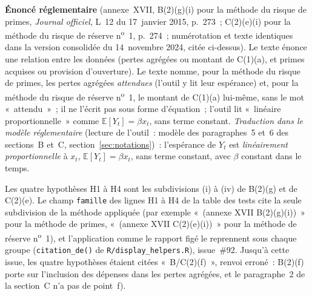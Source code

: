 \documentclass[a4paper,11pt]{article}
\newcommand{\code}[1]{\texttt{\small #1}}
\begin{document}
\begin{encadre}
\textbf{Énoncé réglementaire} (annexe~XVII, B(2)(g)(i) pour la méthode du risque de primes,
\emph{Journal officiel}, L~12 du 17~janvier 2015, p.~273~; C(2)(e)(i) pour la méthode du risque
de réserve n\textsuperscript{o}~1, p.~274~; numérotation et texte identiques dans la version
consolidée du 14~novembre 2024, citée ci-dessus). Le texte énonce une relation entre les données
(pertes agrégées ou montant de C(1)(a), et primes acquises ou provision d'ouverture). Le texte
nomme, pour la méthode du risque de primes, les pertes agrégées \emph{attendues} (l'outil y
lit leur espérance) et, pour la méthode du risque de réserve n\textsuperscript{o}~1, le montant
de C(1)(a) lui-même, sans le mot «~attendu~»~; il ne l'écrit pas sous forme d'équation~;
l'outil lit «~linéaire proportionnelle~» comme $\mathbb{E}[Y_t] = \beta x_t$, sans terme
constant. \emph{Traduction dans le modèle réglementaire} (lecture de
l'outil~: modèle des paragraphes~5 et~6 des sections~B et~C, section~\ref{sec:notations})~:
l'espérance de $Y_t$ est \emph{linéairement proportionnelle} à $x_t$,
$\mathbb{E}[Y_t] = \beta x_t$, sans terme constant, avec $\beta$ constant dans le temps.

\smallskip
Les quatre hypothèses H1 à H4 sont les subdivisions (i) à (iv) de B(2)(g) et de C(2)(e). Le champ
\code{famille} des lignes H1 à H4 de la table des tests cite la seule subdivision de la méthode
appliquée (par exemple «~(annexe XVII B(2)(g)(i))~» pour la méthode de primes, «~(annexe XVII
C(2)(e)(i))~» pour la méthode de réserve n\textsuperscript{o}~1), et l'application comme le
rapport figé le reprennent sous chaque groupe (\code{citation\_de()} de
\code{R/display\_helpers.R}), issue~\#92. Jusqu'à cette issue, les quatre hypothèses étaient
citées «~B/C(2)(f)~», renvoi erroné~: B(2)(f) porte sur l'inclusion des dépenses dans les pertes
agrégées, et le paragraphe~2 de la section~C n'a pas de point~f).
\end{encadre}
\end{document}
